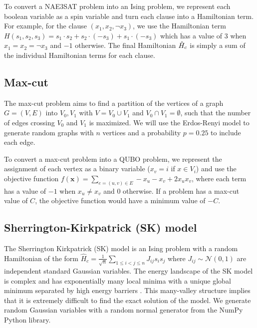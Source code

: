 To convert a NAE3SAT problem into an Ising problem, we represent each boolean variable as a spin variable and turn each clause into a Hamiltonian term. For example, for the clause $(x_1, x_2, \neg x_3)$, we use the Hamiltonian term $H(s_1, s_2, s_3) = s_1 \cdot s_2 + s_2 \cdot (-s_3) + s_1 \cdot (-s_3)$ which has a value of $3$ when $x_1=x_2=\neg x_3$ and $-1$ otherwise. The final Hamiltonian $\Hat{H}_c$ is simply a sum of the individual Hamiltonian terms for each clause.

\subsection*{Max-cut}
The max-cut problem aims to find a partition of the vertices of a graph $G = (V, E)$ into $V_0, V_1$ with $V = V_0 \cup V_1$ and $V_0 \cap V_1 = \emptyset$, such that the number of edges crossing $V_0$ and $V_1$ is maximized. We will use the Erdos-Renyi model to generate random graphs with $n$ vertices and a probability $p=0.25$ to include each edge.

To convert a max-cut problem into a QUBO problem, we represent the assignment of each vertex as a binary variable ($x_v = i$ if $x \in V_i$) and use the objective function $f(\mathbf{x}) = \sum_{e = (u, v) \in E} -x_u - x_v + 2x_u x_v$, where each term has a value of $-1$ when $x_u  \neq x_v$ and $0$ otherwise. If a problem has a max-cut value of $C$, the objective function would have a minimum value of $-C$. 

\subsection*{Sherrington-Kirkpatrick (SK) model}
The Sherrington Kirkpatrick (SK) model is an Ising problem with a random Hamiltonian of the form $\hat{H}_c = \frac{1}{\sqrt{n}} \sum_{1 \leq i < j \leq n} J_{ij}s_i s_j$
where $J_{ij} \sim \mathcal{N}(0,1)$ are independent standard Gaussian variables. The energy landscape of the SK model is complex and has exponentially many local minima with a unique global minimum separated by high energy barriers \cite{skmodel}. This many-valley structure implies that it is extremely difficult to find the exact solution of the model. We generate random Gaussian variables with a random normal generator from the NumPy Python library.


